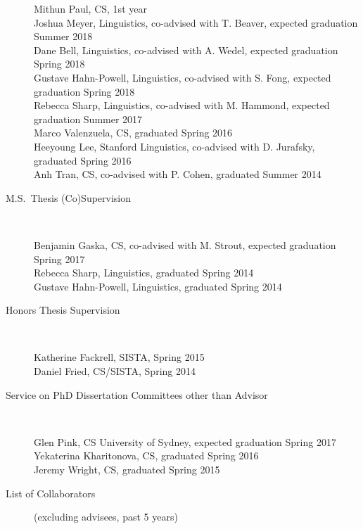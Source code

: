 \documentclass[10pt]{article}
\begin{document}
\begin{description}
Mithun Paul, CS, 1st year \\
Joshua Meyer, Linguistics, co-advised with T. Beaver, expected graduation Summer 2018 \\
Dane Bell, Linguistics, co-advised with A. Wedel, expected graduation Spring 2018 \\
Gustave Hahn-Powell, Linguistics, co-advised with S. Fong, expected graduation Spring 2018 \\
Rebecca Sharp, Linguistics, co-advised with M. Hammond, expected graduation Summer 2017 \\
Marco Valenzuela, CS, graduated Spring 2016 \\
Heeyoung Lee, Stanford Linguistics, co-advised with D. Jurafsky, graduated Spring 2016 \\
Anh Tran, CS, co-advised with P. Cohen, graduated Summer 2014

\vspace{-.1cm}\item [M.S.~Thesis (Co)Supervision ]\

Benjamin Gaska, CS, co-advised with M. Strout, expected graduation Spring 2017\\
Rebecca Sharp, Linguistics, graduated Spring 2014 \\
Gustave Hahn-Powell, Linguistics, graduated Spring 2014 

\vspace{-.1cm}\item [Honors Thesis Supervision ]\

Katherine Fackrell, SISTA, Spring 2015 \\
Daniel Fried, CS/SISTA, Spring 2014

\vspace{-.1cm}\item [Service on PhD Dissertation Committees other than Advisor ]\

Glen Pink, CS University of Sydney, expected graduation Spring 2017 \\
Yekaterina Kharitonova, CS, graduated Spring 2016 \\
Jeremy Wright, CS, graduated Spring 2015 

\newpage
\vspace{-.1cm}\item [List of Collaborators ] (excluding advisees, past 5 years)\


\end{description}
\end{document}
